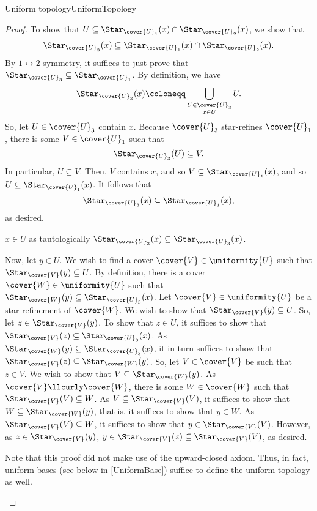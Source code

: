 \begin{prp}{Uniform topology}{UniformTopology}
\begin{proof}
To show that $U\subseteq \Star _{\cover{U}_1}(x)\cap \Star _{\cover{U}_2}(x)$, we show that
\begin{equation}
\Star _{\cover{U}_3}(x)\subseteq \Star _{\cover{U}_1}(x)\cap \Star _{\cover{U}_2}(x).
\end{equation}
By $1\leftrightarrow 2$ symmetry, it suffices to just prove that $\Star _{\cover{U}_3}\subseteq \Star _{\cover{U}_1}$.  By definition, we have
\begin{equation}
\Star _{\cover{U}_3}(x)\coloneqq \bigcup _{\substack{U\in \cover{U}_3 \\ x\in U}}U.
\end{equation}
So, let $U\in \cover{U}_3$ contain $x$.  Because $\cover{U}_3$ star-refines $\cover{U}_1$, there is some $V\in \cover{U}_1$ such that
\begin{equation}
\Star _{\cover{U}_3}(U)\subseteq V.
\end{equation}
In particular, $U\subseteq V$.  Then, $V$ contains $x$, and so $V\subseteq \Star _{\cover{U}_1}(x)$, and so $U\subseteq \Star _{\cover{U}_1}(x)$.  It follows that
\begin{equation}
\Star _{\cover{U}_3}(x)\subseteq \Star _{\cover{U}_1}(x),
\end{equation}
as desired.

$x\in U$ as tautologically $\Star _{\cover{U}_3}(x)\subseteq \Star _{\cover{U}_3}(x)$.

Now, let $y\in U$.  We wish to find a cover $\cover{V}\in \uniformity{U}$ such that $\Star _{\cover{V}}(y)\subseteq U$.  By definition, there is a cover $\cover{W}\in \uniformity{U}$ such that $\Star _{\cover{W}}(y)\subseteq \Star _{\cover{U}_3}(x)$.  Let $\cover{V}\in \uniformity{U}$ be a star-refinement of $\cover{W}$.  We wish to show that $\Star _{\cover{V}}(y)\subseteq U$.  So, let $z\in \Star _{\cover{V}}(y)$.  To show that $z\in U$, it suffices to show that $\Star _{\cover{V}}(z)\subseteq \Star _{\cover{U}_3}(x)$.  As $\Star _{\cover{W}}(y)\subseteq \Star _{\cover{U}_3}(x)$, it in turn suffices to show that $\Star _{\cover{V}}(z)\subseteq \Star _{\cover{W}}(y)$.  So, let $V\in \cover{V}$ be such that $z\in V$.  We wish to show that $V\subseteq \Star _{\cover{W}}(y)$.  As $\cover{V}\llcurly \cover{W}$, there is some $W\in \cover{W}$ such that $\Star _{\cover{V}}(V)\subseteq W$.  As $V\subseteq \Star _{\cover{V}}(V)$, it suffices to show that $W\subseteq \Star _{\cover{W}}(y)$, that is, it suffices to show that $y\in W$.  As $\Star _{\cover{V}}(V)\subseteq W$, it suffices to show that $y\in \Star _{\cover{V}}(V)$.  However, as $z\in \Star _{\cover{V}}(y)$, $y\in \Star _{\cover{V}}(z)\subseteq \Star _{\cover{V}}(V)$, as desired.
\begin{rmk}
Note that this proof did not make use of the upward-closed axiom.  Thus, in fact, uniform bases (see below in \cref{UniformBase}) suffice to define the uniform topology as well.
\end{rmk}
\end{proof}
\end{prp}

